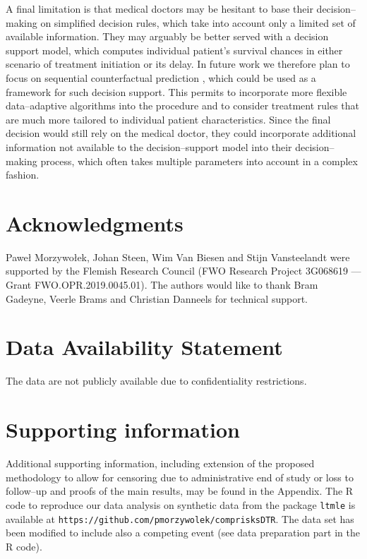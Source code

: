 \documentclass[12pt]{article}
\begin{document}
\indent
A final limitation is that medical doctors may be hesitant to base their decision--making on simplified decision rules,  which take into account only a limited set of available information.  They may arguably be better served with a decision support model,  which computes individual patient's survival chances in either scenario of treatment initiation or its delay.  In future work we therefore plan to focus on sequential counterfactual prediction \citep{Wager2018, Coston2020},  which could be used as a framework for such decision support. This permits to incorporate more flexible data--adaptive algorithms into the procedure and to consider treatment rules that are much more tailored to individual patient characteristics. Since the final decision would still rely on the medical doctor, they could incorporate additional information not available to the decision--support model into their decision--making process, which often takes multiple parameters into account in a complex fashion. 

\section*{Acknowledgments}
Paweł Morzywołek,  Johan Steen,  Wim Van Biesen and Stijn Vansteelandt were supported by the Flemish Research Council (FWO Research Project 3G068619 — Grant FWO.OPR.2019.0045.01). The authors would like to thank Bram Gadeyne, Veerle Brams and Christian Danneels for technical support.

\section*{Data Availability Statement}

The data are not publicly available due to confidentiality restrictions.

\section*{Supporting information}

Additional supporting information, including extension of the proposed methodology to allow for censoring due to administrative end of study or loss to follow--up and proofs of the main results, may be found in the Appendix. The R code to reproduce our data analysis on synthetic data from the package \texttt{ltmle} \citep{Lendle2017} is available at \texttt{https://github.com/pmorzywolek/comprisksDTR}. The data set has been modified to include also a competing event (see data preparation part in the R code).
\end{document}
